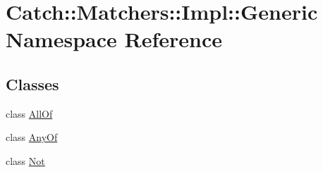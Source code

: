 \hypertarget{namespace_catch_1_1_matchers_1_1_impl_1_1_generic}{}\section{Catch\+:\+:Matchers\+:\+:Impl\+:\+:Generic Namespace Reference}
\label{namespace_catch_1_1_matchers_1_1_impl_1_1_generic}
\subsection*{Classes}
\begin{DoxyCompactItemize}
\item 
class \hyperlink{class_catch_1_1_matchers_1_1_impl_1_1_generic_1_1_all_of}{All\+Of}
\item 
class \hyperlink{class_catch_1_1_matchers_1_1_impl_1_1_generic_1_1_any_of}{Any\+Of}
\item 
class \hyperlink{class_catch_1_1_matchers_1_1_impl_1_1_generic_1_1_not}{Not}
\end{DoxyCompactItemize}
